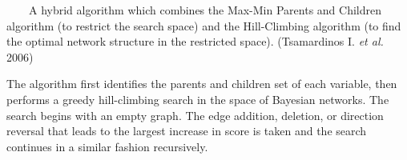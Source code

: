 ~~~~A hybrid algorithm which combines the Max-Min Parents and Children algorithm (to restrict the search space) and the Hill-Climbing algorithm (to find the optimal network structure in the restricted space). (Tsamardinos I. \emph{et al.} 2006)

The algorithm first identifies the parents and children set of each variable, then performs a greedy hill-climbing search in the space of Bayesian networks. The search begins with an empty graph. The edge addition, deletion, or direction reversal that leads to the largest increase in score is taken and the search continues in a similar fashion recursively.